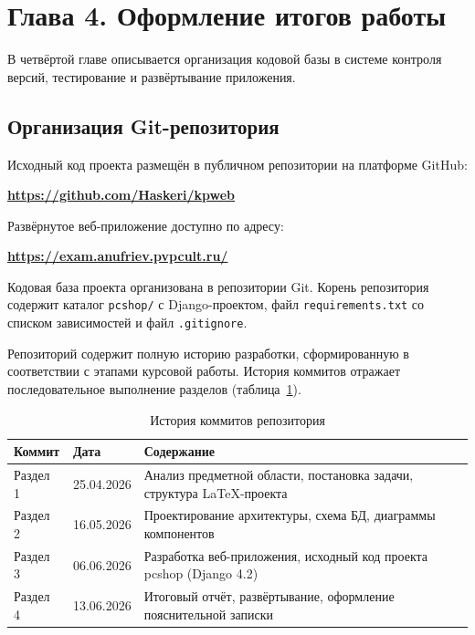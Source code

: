 \section*{Глава 4. Оформление итогов работы}

В четвёртой главе описывается организация кодовой базы в системе контроля версий, тестирование и развёртывание приложения.

\subsection{Организация Git-репозитория}

Исходный код проекта размещён в публичном репозитории на платформе GitHub:

\begin{center}
\textbf{\url{https://github.com/Haskeri/kpweb}}
\end{center}

Развёрнутое веб-приложение доступно по адресу:

\begin{center}
\textbf{\url{https://exam.anufriev.pvpcult.ru/}}
\end{center}

Кодовая база проекта организована в репозитории Git. Корень репозитория содержит каталог \texttt{pcshop/} с Django-проектом, файл \texttt{requirements.txt} со списком зависимостей и файл \texttt{.gitignore}.

Репозиторий содержит полную историю разработки, сформированную в соответствии с этапами курсовой работы. История коммитов отражает последовательное выполнение разделов (таблица~\ref{tab:commits}).

\begin{table}[ht!]
\caption{История коммитов репозитория}
\label{tab:commits}
\small
\begin{tabularx}{\textwidth}{|p{}|p{}|>{\RaggedRight\arraybackslash}X|}
\hline
\textbf{Коммит} & \textbf{Дата} & \textbf{Содержание} \\ \hline
Раздел 1 & 25.04.2026 & Анализ предметной области, постановка задачи, структура LaTeX-проекта \\ \hline
Раздел 2 & 16.05.2026 & Проектирование архитектуры, схема БД, диаграммы компонентов \\ \hline
Раздел 3 & 06.06.2026 & Разработка веб-приложения, исходный код проекта pcshop (Django 4.2) \\ \hline
Раздел 4 & 13.06.2026 & Итоговый отчёт, развёртывание, оформление пояснительной записки \\ \hline
\end{tabularx}
\end{table}

